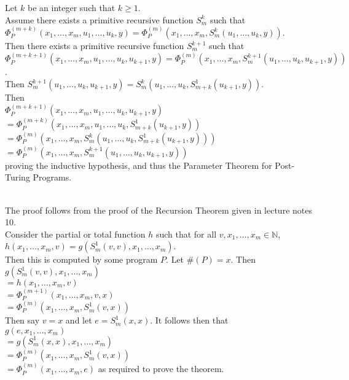 \documentclass{assignment}
\begin{document}
\begin{problemlist}
\begin{answer}
    Let $k$ be an integer such that $k \ge 1$.\\
    Assume there exists a primitive recursive function $S_m^k$ such that\\
    $\Phi_P^{(m+k)}(x_1,\ldots,x_m,u_1,\ldots,u_k,y)=\Phi_P^{(m)}(x_1,\ldots,x_m,S_m^k(u_1,\ldots,u_k,y))$.\\
    Then there exists a primitive recursive function $S_m^{k+1}$ such that\\
    $\Phi_P^{(m+k+1)}(x_1,\ldots,x_m,u_1,\ldots,u_k,u_{k+1},y)=\Phi_P^{(m)}(x_1,\ldots,x_m,S_m^{k+1}(u_1,\ldots,u_k,u_{k+1},y))$.\\
    Then $S_m^{k+1}(u_1,\ldots,u_k,u_{k+1},y)=S_m^{k}(u_1,\ldots,u_k,S_{m+k}^1(u_{k+1},y))$.\\
    Then\\
    $\Phi_P^{(m+k+1)}(x_1,\ldots,x_m,u_1,\ldots,u_k,u_{k+1},y)$\\
    $=\Phi_P^{(m+k)}(x_1,\ldots,x_m,u_1,\ldots,u_k,S_{m+k}^1(u_{k+1},y))$\\
    $=\Phi_P^{(m)}(x_1,\ldots,x_m,S_m^k(u_1,\ldots,u_k,S_{m+k}^1(u_{k+1},y)))$\\
    $=\Phi_P^{(m)}(x_1,\ldots,x_m,S_m^{k+1}(u_1,\ldots,u_k,u_{k+1},y))$\\
    proving the inductive hypothesis, and thus the Parameter Theorem for Post-Turing Programs.
  \end{answer}

  \clearpage
  \pbitem
  \begin{problem}
  \end{problem}
  \begin{answer}
    \\
    The proof follows from the proof of the Recursion Theorem given in lecture notes 10.\\
    Consider the partial or total function $h$ such that for all $v,x_1,\ldots,x_m\in \mathbb{N}$,\\
    $h(x_1,\ldots,x_m,v)=g(S_m^1(v,v),x_1,\ldots,x_m)$.\\
    Then this is computed by some program $P$. Let $\#(P)=x$. Then\\
    $g(S_m^1(v,v),x_1,\ldots,x_m)$\\
    $=h(x_1,\ldots,x_m,v)$\\
    $=\Phi_P^{(m+1)}(x_1,\ldots,x_m,v,x)$\\
    $=\Phi_P^{(m)}(x_1,\ldots,x_m,S_m^1(v,x))$\\
    Then say $v=x$ and let $e=S_m^1(x,x)$. It follows then that\\
    $g(e,x_1,\ldots,x_m)$\\
    $=g(S_m^1(x,x),x_1,\ldots,x_m)$\\
    $=\Phi_P^{(m)}(x_1,\ldots,x_m,S_m^1(v,x))$\\
    $=\Phi_P^{(m)}(x_1,\ldots,x_m,e)$ as required to prove the theorem.
  \end{answer}
  
\end{problemlist}
\end{document}
